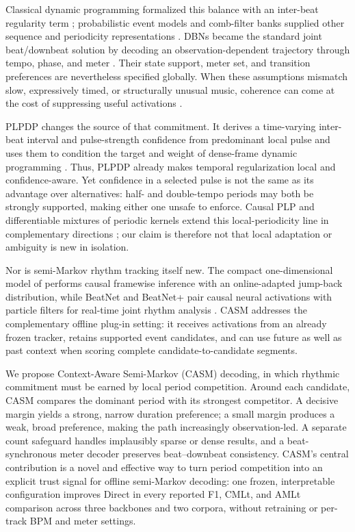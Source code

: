 \documentclass{article}
\begin{document}
Classical dynamic programming formalized this balance with an inter-beat
regularity term \cite{ellis2007beattracking}; probabilistic event models and
comb-filter banks supplied other sequence and periodicity representations
\cite{korzeniowski2014crf,bock2015combfilter}. DBNs became the standard joint
beat/downbeat solution by decoding an observation-dependent trajectory through
tempo, phase, and meter \cite{krebs2015dbn,bock2016joint}. Their state support,
meter set, and transition preferences are nevertheless specified globally. When
these assumptions mismatch slow, expressively timed, or structurally unusual
music, coherence can come at the cost of suppressing useful activations
\cite{foscarin2024beat,ahn2026smcblindspot}.

PLPDP changes the source of that commitment. It derives a time-varying
inter-beat interval and pulse-strength confidence from predominant local pulse
and uses them to condition the target and weight of dense-frame dynamic
programming \cite{chiu2023localperiodicity}. Thus, PLPDP already makes temporal
regularization local and confidence-aware. Yet confidence in a selected pulse is
not the same as its advantage over alternatives: half- and double-tempo periods
may both be strongly supported, making either one unsafe to enforce. Causal PLP
and differentiable mixtures of periodic kernels extend this local-periodicity
line in complementary directions \cite{meier2024realtime,chiu2025dplp}; our
claim is therefore not that local adaptation or ambiguity is new in isolation.

Nor is semi-Markov rhythm tracking itself new. The compact one-dimensional model
of \cite{heydari2022semimarkov} performs causal framewise inference with an
online-adapted jump-back distribution, while BeatNet and BeatNet+ pair causal
neural activations with particle filters for real-time joint rhythm analysis
\cite{heydari2021beatnet,heydari2024beatnetplus}. CASM addresses the complementary
offline plug-in setting: it receives activations from an already frozen tracker,
retains supported event candidates, and can use future as well as past context
when scoring complete candidate-to-candidate segments.

We propose Context-Aware Semi-Markov (CASM) decoding, in which rhythmic
commitment must be earned by local period competition. Around each candidate,
CASM compares the dominant period with its strongest competitor. A decisive
margin yields a strong, narrow duration preference; a small margin produces a
weak, broad preference, making the path increasingly observation-led. A separate
count safeguard handles implausibly sparse or dense results, and a
beat-synchronous meter decoder preserves beat--downbeat consistency. CASM's
central contribution is a novel and effective way to turn period competition
into an explicit trust signal for offline semi-Markov decoding: one frozen,
interpretable configuration improves Direct in every reported F1, CMLt, and
AMLt comparison across three backbones and two corpora, without retraining or
per-track BPM and meter settings.
\end{document}
